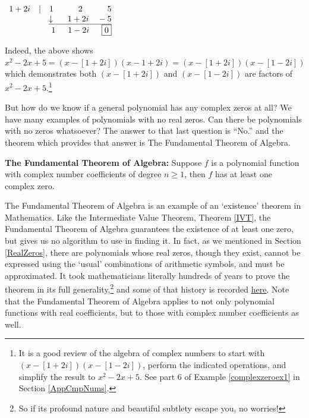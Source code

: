 \documentclass{ximera}
\begin{document}
\begin{center}
$
\begin{array}{r}
 1+2i \quad |\quad1 \quad\quad\quad 2 \quad\quad\quad 5 \\
 \underline{\downarrow \phantom{1}\quad  1+2i \quad -5}\\
1 \phantom{1}\quad 1-2i \phantom{111} \fbox{0}
\end{array}
$    
\end{center}


Indeed, the above shows $x^2-2x+5  = (x-[1+2i])(x-1+2i)= (x-[1+2i])(x-[1-2i])$ which demonstrates both  $(x-[1+2i])$ and  $(x-[1-2i])$ are factors of $x^2-2x+5$.\footnote{It is a good review of the algebra of complex numbers to start with  $(x-[1+2i])(x-[1-2i])$, perform the indicated operations, and simplify the result to $x^2-2x+5$.  See part 6 of  Example \ref{complexzeroex1}  in Section  \ref{AppCmpNums}.}


 But how do we know if a general polynomial has any complex zeros at all?  We have many examples of polynomials with no real zeros.  Can there be polynomials with no zeros whatsoever?  The answer to that last question is ``No.'' and the theorem which provides that answer is  The Fundamental Theorem of Algebra.



\begin{theorem} \label{ftoa} \textbf{The Fundamental Theorem of Algebra:}  Suppose $f$ is a polynomial function with complex number coefficients of degree $n \geq 1$, then $f$ has at least one complex zero.

\end{theorem}



The Fundamental Theorem of Algebra is an example of an `existence' theorem in Mathematics.  Like the Intermediate Value Theorem, Theorem \ref{IVT}, the Fundamental Theorem of Algebra  guarantees the existence of at least one zero, but gives us no algorithm to use in finding it.  In fact, as we mentioned in Section \ref{RealZeros}, there are polynomials whose real zeros, though they exist, cannot be expressed using the `usual' combinations of arithmetic symbols, and must be approximated.  It took mathematicians literally hundreds of years to prove the theorem in its full generality,\footnote{So if its profound nature and beautiful subtlety escape you, no worries!} and some of that history is recorded \href{http://en.wikipedia.org/wiki/Fundamental_theorem_of_algebra}{\underline{here}}.  Note that the Fundamental Theorem of Algebra  applies to not only polynomial functions with real coefficients, but to those with complex number coefficients as well.  
\end{document}
